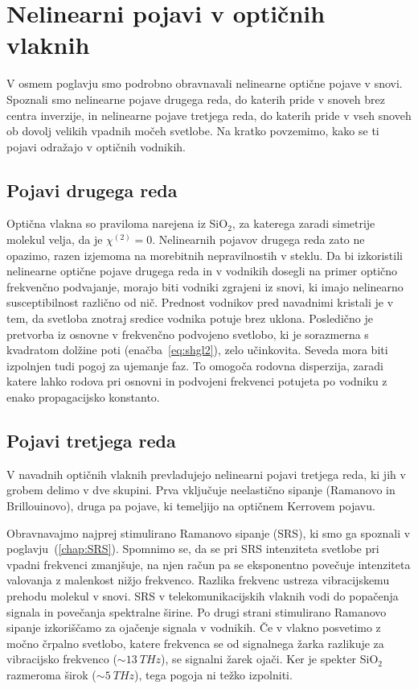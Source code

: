 \section{Nelinearni pojavi v optičnih vlaknih}
V osmem poglavju smo podrobno obravnavali nelinearne optične pojave v snovi.
Spoznali smo nelinearne pojave drugega reda, do katerih pride v snoveh brez centra inverzije, 
in nelinearne pojave tretjega reda, do katerih pride v vseh snoveh ob dovolj velikih vpadnih
močeh svetlobe. Na kratko povzemimo, kako se ti pojavi odražajo v optičnih vodnikih. 

\subsection*{Pojavi drugega reda}
Optična vlakna so praviloma narejena iz SiO$_2$, 
za katerega zaradi simetrije molekul velja, da je $\chi^{(2)}=0$. 
Nelinearnih pojavov drugega reda zato ne opazimo, razen izjemoma na morebitnih 
nepravilnostih v steklu.
Da bi izkoristili nelinearne optične pojave
drugega reda in v vodnikih dosegli na primer optično frekvenčno podvajanje,
morajo biti vodniki zgrajeni iz snovi, ki imajo nelinearno susceptibilnost 
različno od nič. Prednost vodnikov pred navadnimi kristali je v tem, 
da svetloba znotraj sredice vodnika potuje brez uklona. Posledično je
pretvorba iz osnovne v frekvenčno podvojeno svetlobo, ki je sorazmerna s kvadratom 
dolžine poti (enačba~\ref{eq:shgl2}), zelo učinkovita. Seveda 
mora biti izpolnjen tudi pogoj za ujemanje faz. To 
omogoča rodovna disperzija, zaradi 
katere lahko rodova pri osnovni in podvojeni frekvenci potujeta po vodniku
z enako propagacijsko konstanto.

\subsection*{Pojavi tretjega reda}
V navadnih optičnih vlaknih  
prevladujejo nelinearni pojavi tretjega reda, ki jih v grobem delimo v dve skupini. Prva vključuje
neelastično sipanje (Ramanovo in Brillouinovo), druga pa pojave, ki 
temeljijo na optičnem Kerrovem pojavu.

Obravnavajmo najprej stimulirano Ramanovo sipanje 
(SRS), ki smo
ga spoznali v poglavju~(\ref{chap:SRS}). Spomnimo se, da se pri SRS intenziteta
svetlobe pri vpadni frekvenci zmanjšuje, na njen račun pa se eksponentno povečuje 
intenziteta valovanja z malenkost nižjo frekvenco. Razlika frekvenc ustreza
vibracijskemu prehodu molekul v snovi. SRS v telekomunikacijskih vlaknih 
vodi do popačenja signala
in povečanja spektralne širine. Po drugi strani stimulirano Ramanovo sipanje 
izkoriščamo za ojačenje signala v vodnikih. Če v vlakno posvetimo z močno črpalno
svetlobo, katere frekvenca se od signalnega žarka razlikuje za vibracijsko frekvenco
($\sim 13~\si{THz}$), se signalni žarek ojači. Ker je spekter SiO$_2$ razmeroma 
širok ($\sim 5~\si{THz}$), tega pogoja ni težko izpolniti. 

